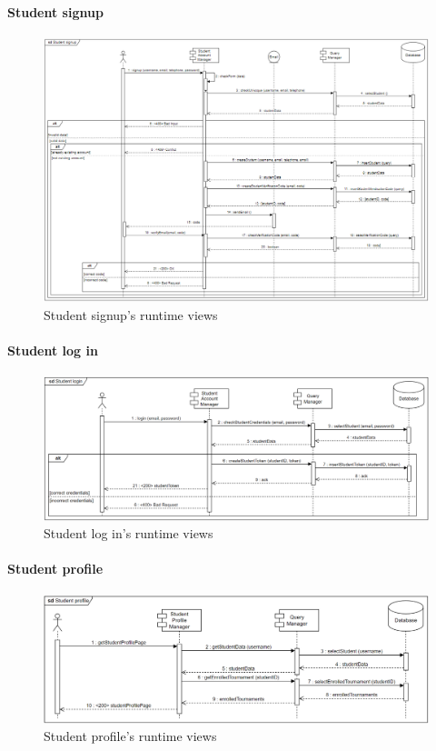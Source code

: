 \documentclass[12pt, a4paper]{report}
\begin{document}
    \paragraph*{Student signup}
    \begin{figure}[H]
        \centering
        \includegraphics[width=1.0\linewidth]{images/ssrv.png}
        \caption{Student signup's runtime views}
    \end{figure}

    \paragraph*{Student log in}
    \begin{figure}[H]
        \centering
        \includegraphics[width=1.0\linewidth]{images/slirv.png}
        \caption{Student log in's runtime views}
    \end{figure}

    \paragraph*{Student profile}
    \begin{figure}[H]
        \centering
        \includegraphics[width=1.0\linewidth]{images/sprv.png}
        \caption{Student profile's runtime views}
    \end{figure}
\end{document}
